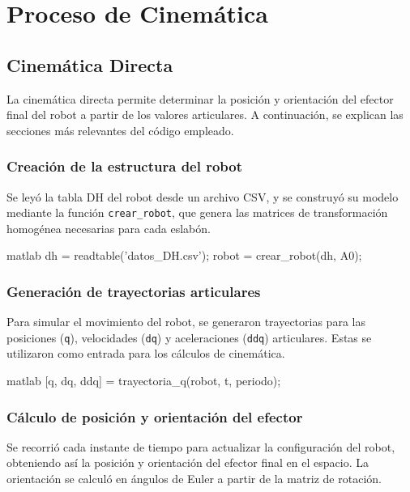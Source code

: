\section{Proceso de Cinemática} \label{sec:proceso_cinematica}

\subsection{Cinemática Directa}

La cinemática directa permite determinar la posición y orientación del efector final del robot a partir de los valores articulares. A continuación, se explican las secciones más relevantes del código empleado.

\subsubsection*{Creación de la estructura del robot}

Se leyó la tabla DH del robot desde un archivo CSV, y se construyó su modelo mediante la función \texttt{crear\_robot}, que genera las matrices de transformación homogénea necesarias para cada eslabón.

\begin{matlabcode}{matlab}
	dh = readtable('datos\tabla_DH\robotnuestro.csv');
	robot = crear_robot(dh, A0);
\end{matlabcode}

\subsubsection*{Generación de trayectorias articulares}

Para simular el movimiento del robot, se generaron trayectorias para las posiciones (\texttt{q}), velocidades (\texttt{dq}) y aceleraciones (\texttt{ddq}) articulares. Estas se utilizaron como entrada para los cálculos de cinemática.

\begin{matlabcode}{matlab}
	[q, dq, ddq] = trayectoria_q(robot, t, periodo);
\end{matlabcode}

\subsubsection*{Cálculo de posición y orientación del efector}

Se recorrió cada instante de tiempo para actualizar la configuración del robot, obteniendo así la posición y orientación del efector final en el espacio. La orientación se calculó en ángulos de Euler a partir de la matriz de rotación.

